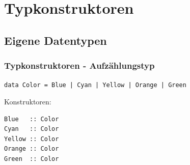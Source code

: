 \subtitle{Tag drei - noch etwas mehr} 
\date{26.03.2014}

\begin{frame}[plain]
\titlepage
\end{frame}

\section{Typkonstruktoren}
\subsection{Eigene Datentypen}

\begin{frame}[fragile]
\frametitle{Typkonstruktoren - Aufzählungstyp} 
\begin{block}{\vspace*{-3ex}}
\lstinline!data Color = Blue | Cyan | Yellow | Orange | Green!
\end{block}
\pause
{}
\pause
Konstruktoren:
\begin{lstlisting}
Blue   :: Color
Cyan   :: Color
Yellow :: Color
Orange :: Color
Green  :: Color
\end{lstlisting}
\end{frame}

